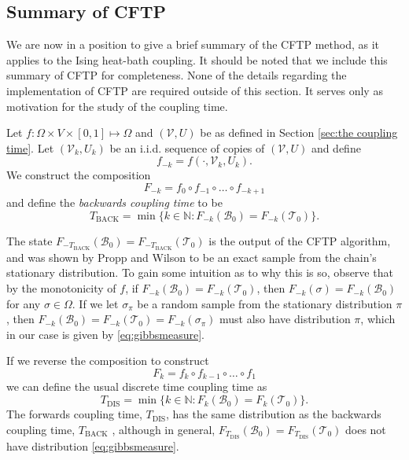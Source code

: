 	\subsection{Summary of CFTP}
	\label{sec:summary of CFTP}
	We are now in a position to give a brief summary of the CFTP method, as it applies to the Ising heat-bath coupling. It should be noted that we include this summary of CFTP for completeness. None of the details regarding the implementation of CFTP are required outside of this section. It serves only as motivation for the study of the coupling time.

	Let $f: \Omega \times V \times [0,1] \mapsto \Omega$ and $(\mathcal{V}, U)$ be as defined in Section \ref{sec:the coupling time}. Let $(\mathcal{V}_k, U_k)$ be an i.i.d. sequence of copies of $(\mathcal{V}, U)$ and define 
	\begin{equation}
		f_{-k} = f(\cdot, \mathcal{V}_k, U_k).
	\end{equation}
	We construct the composition
	\begin{equation}
		F_{-k} = f_0 \circ f_{-1} \circ \dots \circ f_{-k+1}
	\end{equation}
	and define the \emph{backwards coupling time} to be
	\begin{equation}
		T_\mathrm{BACK} = \min\{k \in \mathbb{N} : F_{-k}(\mathscr{B}_0) = F_{-k}(\mathscr{T}_0)\}.
	\end{equation}

	The state $F_{-T_\mathrm{BACK}}(\mathscr{B}_0) = F_{-T_\mathrm{BACK}}(\mathscr{T}_0)$ is the output of the CFTP algorithm, and was shown by Propp and Wilson \cite{Propp1996-cf} to be an exact sample from the chain's stationary distribution. To gain some intuition as to why this is so, observe that by the monotonicity of $f$, if $F_{-k}(\mathscr{B}_0) = F_{-k}(\mathscr{T}_0)$, then $F_{-k}(\sigma) = F_{-k}(\mathscr{B}_0)$ for any $\sigma \in \Omega$. If we let $\sigma_\pi$ be a random sample from the stationary distribution $\pi$, then $F_{-k}(\mathscr{B}_0) = F_{-k}(\mathscr{T}_0) = F_{-k}(\sigma_\pi)$ must also have distribution $\pi$, which in our case is given by \eqref{eq:gibbsmeasure}.
	
	If we reverse the composition to construct
	\begin{equation}
		F_{k} = f_{k} \circ f_{k-1} \circ \dots \circ f_1
	\end{equation}
	we can define the usual discrete time coupling time as
	\begin{equation}
		T_\mathrm{DIS} =  \min\{k \in \mathbb{N} : F_{k}(\mathscr{B}_0) = F_{k}(\mathscr{T}_0)\}.
	\end{equation}
	The forwards coupling time, $T_\mathrm{DIS}$, has the same distribution as the backwards coupling time, $T_\mathrm{BACK}$ \cite{Propp1996-cf}, although in general, $F_{T_\mathrm{DIS}}(\mathscr{B}_0) = F_{T_\mathrm{DIS}}(\mathscr{T}_0)$ does not have distribution \eqref{eq:gibbsmeasure}.

